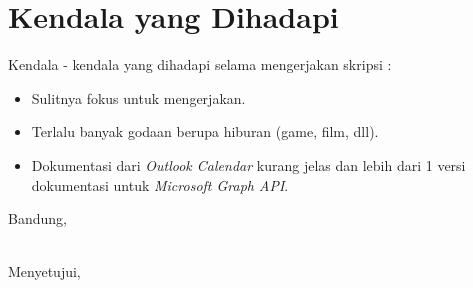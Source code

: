 \documentclass[a4paper,twoside]{article}
\begin{document}
\section{Kendala yang Dihadapi}
Kendala - kendala yang dihadapi selama mengerjakan skripsi :
\begin{itemize}
	\item Sulitnya fokus untuk mengerjakan. 
	\item Terlalu banyak godaan berupa hiburan (game, film, dll). 
	\item Dokumentasi dari \textit{Outlook Calendar} kurang jelas dan lebih dari 1 versi dokumentasi untuk \textit{Microsoft Graph API}.
\end{itemize}

\vspace{1cm}
\centering Bandung, \tanggal\\
\vspace{2cm} \nama \\ 
\vspace{1cm}

Menyetujui, \\
\end{document}
